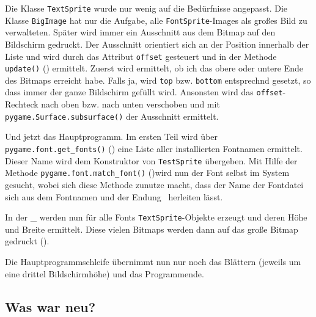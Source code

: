 Die Klasse \texttt{TextSprite} wurde nur wenig auf die Bedürfnisse angepasst. Die Klasse \texttt{BigImage} hat nur die Aufgabe, alle \texttt{FontSprite}-Images als großes Bild zu verwalteten. Später wird immer ein Ausschnitt aus dem Bitmap auf den Bildschirm gedruckt. Der Ausschnitt orientiert sich an der Position innerhalb der Liste und wird durch das Attribut \texttt{offset} gesteuert und in der Methode \texttt{update()} () ermittelt. Zuerst wird ermittelt, ob ich das obere oder untere Ende des Bitmaps erreicht habe. Falls ja, wird \texttt{top} bzw. \texttt{bottom} entsprechnd gesetzt, so dass immer der ganze Bildschirm gefüllt wird. Ansonsten wird das \texttt{offset}-Rechteck nach oben bzw. nach unten verschoben und mit \texttt{pygame.Surface.subsurface()} der Ausschnitt ermittelt.


Und jetzt das Hauptprogramm. Im ersten Teil wird über \texttt{pygame.font.get\_fonts()} () eine Liste aller installierten Fontnamen ermittelt. Dieser Name wird dem Konstruktor von \texttt{TestSprite} übergeben. Mit Hilfe der Methode \texttt{pygame.font.match\_font()} ()wird nun der Font selbst im System gesucht, wobei sich diese Methode zunutze macht, dass der Name der Fontdatei sich aus dem Fontnamen und der Endung~ herleiten lässt.


In der \forSchleife\_ werden nun für alle Fonts \texttt{TextSprite}-Objekte erzeugt und deren Höhe und Breite ermittelt. Diese vielen Bitmaps werden dann auf das große Bitmap gedruckt ().



Die Hauptprogrammschleife übernimmt nun nur noch das Blättern (jeweils um eine drittel Bildschirmhöhe) und das Programmende.


\subsection*{Was war neu?}


